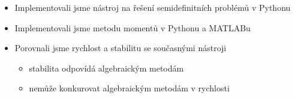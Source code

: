 \documentclass[cmpiitalkstyle, 22pt]{cmptalk}
\begin{document}
\begin{cmptalkslide}[Shrnutí]
  \begin{itemize}
    \item Implementovali jsme nástroj na řešení semidefinitních problémů v Pythonu
    \item Implementovali jsme metodu momentů v Pythonu a MATLABu
    \item Porovnali jsme rychlost a stabilitu se současnými nástroji
    \begin{itemize}
      \item stabilita odpovídá algebraickým metodám
      \item nemůže konkurovat algebraickým metodám v rychlosti
    \end{itemize}
  \end{itemize}


\end{cmptalkslide}

\begin{cmptalkslide}
  
  {\small }
\end{cmptalkslide}


\end{document}
